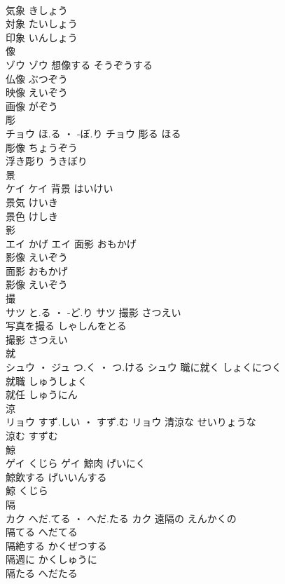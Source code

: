 \documentclass[8pt]{extreport}
\begin{document}
\begin{CJK}{UTF8}{min}
\\	気象	きしょう	
\\	対象	たいしょう	
\\	印象	いんしょう	
\\	像	
\\	ゾウ		ゾウ	想像する	そうぞうする	
\\	仏像	ぶつぞう	
\\	映像	えいぞう	
\\	画像	がぞう	
\\	彫	
\\	チョウ	ほ.る ・ -ぼ.り	チョウ	彫る	ほる	
\\	彫像	ちょうぞう	
\\	浮き彫り	うきぼり	
\\	景	
\\	ケイ		ケイ	背景	はいけい	
\\	景気	けいき	
\\	景色	けしき	
\\	影	
\\	エイ	かげ	エイ	面影	おもかげ	
\\	影像	えいぞう	
\\	面影	おもかげ	
\\	影像	えいぞう	
\\	撮	
\\	サツ	と.る ・ -ど.り	サツ	撮影	さつえい	
\\	写真を撮る	しゃしんをとる	
\\	撮影	さつえい	
\\	就	
\\	シュウ ・ ジュ	つ.く ・ つ.ける	シュウ	職に就く	しょくにつく	
\\	就職	しゅうしょく	
\\	就任	しゅうにん	
\\	涼	
\\	リョウ	すず.しい ・ すず.む	リョウ	清涼な	せいりょうな	
\\	涼む	すずむ	
\\	鯨	
\\	ゲイ	くじら	ゲイ	鯨肉	げいにく	
\\	鯨飲する	げいいんする	
\\	鯨	くじら	
\\	隔	
\\	カク	へだ.てる ・ へだ.たる	カク	遠隔の	えんかくの	
\\	隔てる	へだてる	
\\	隔絶する	かくぜつする	
\\	隔週に	かくしゅうに	
\\	隔たる	へだたる	

\end{CJK}
\end{document}
